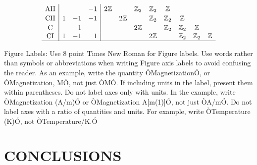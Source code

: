 \documentclass[letterpaper, 10 pt, conference]{ieeeconf}  %
\begin{document}
$$\begin{array}{c|rrr|cccccccc}
\color{black}{\textrm{AII}} & \color{black}{} & \color{black}{} & \color{black}{-1} & \color{black}{2\mathbb{Z}} & \color{black}{} & \color{black}{\mathbb{Z}_2} & \color{black}{\mathbb{Z}_2} & \color{black}{\mathbb{Z}} & \color{black}{} & \color{black}{} & \color{black}{}\T\\
\color{black}{\textrm{CII}} & \color{black}{1} & \color{black}{-1} & \color{black}{-1} & \color{black}{} & \color{black}{2\mathbb{Z}} & \color{black}{} & \color{black}{\mathbb{Z}_2} & \color{black}{\mathbb{Z}_2} & \color{black}{\mathbb{Z}} & \color{black}{} & \color{black}{}\T\\
\color{black}{\textrm{C}} & \color{black}{} & \color{black}{-1} & \color{black}{} & \color{black}{} & \color{black}{} & \color{black}{2\mathbb{Z}} & \color{black}{} & \color{black}{\mathbb{Z}_2} & \color{black}{\mathbb{Z}_2} & \color{black}{\mathbb{Z}} & \color{black}{}\T\\
\color{black}{\textrm{CI}} & \color{black}{1} & \color{black}{-1} & \color{black}{1} & \color{black}{} & \color{black}{} & \color{black}{} & \color{black}{2\mathbb{Z}} & \color{black}{} & \color{black}{\mathbb{Z}_2} & \color{black}{\mathbb{Z}_2} & \color{black}{\mathbb{Z}}\\
\hline
\end{array}
$$


Figure Labels: Use 8 point Times New Roman for Figure labels. Use words rather than symbols or abbreviations when writing Figure axis labels to avoid confusing the reader. As an example, write the quantity ÒMagnetizationÓ, or ÒMagnetization, MÓ, not just ÒMÓ. If including units in the label, present them within parentheses. Do not label axes only with units. In the example, write ÒMagnetization (A/m)Ó or ÒMagnetization {A[m(1)]}Ó, not just ÒA/mÓ. Do not label axes with a ratio of quantities and units. For example, write ÒTemperature (K)Ó, not ÒTemperature/K.Ó

\section{CONCLUSIONS}
\end{document}
